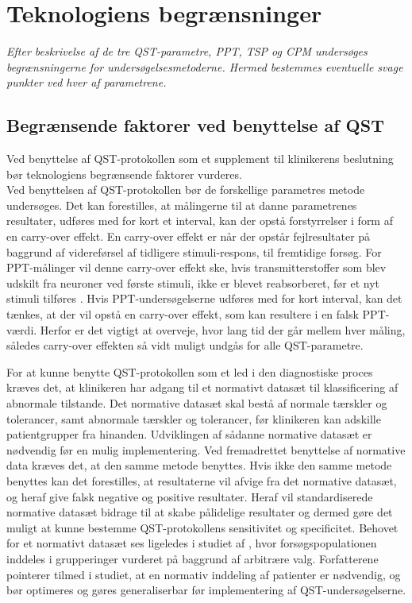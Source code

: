 \section{Teknologiens begrænsninger}
\textit{Efter beskrivelse af de tre QST-parametre, PPT, TSP og CPM undersøges begrænsningerne for undersøgelsesmetoderne. Hermed bestemmes eventuelle svage punkter ved hver af parametrene.}

\subsection{Begrænsende faktorer ved benyttelse af QST}
Ved benyttelse af QST-protokollen som et supplement til klinikerens beslutning bør teknologiens begrænsende faktorer vurderes. \\
Ved benyttelsen af QST-protokollen bør de forskellige parametres metode undersøges. Det kan forestilles, at målingerne til at danne parametrenes resultater, udføres med for kort et interval, kan der opstå forstyrrelser i form af en carry-over effekt. En carry-over effekt er når der opstår fejlresultater på baggrund af videreførsel af tidligere stimuli-respons, til fremtidige forsøg. \citep{Porta2008} For PPT-målinger vil denne carry-over effekt ske, hvis transmitterstoffer som blev udskilt fra neuroner ved første stimuli, ikke er blevet reabsorberet, før et nyt stimuli tilføres \citep{Martini2012}. Hvis PPT-undersøgelserne udføres med for kort interval, kan det tænkes, at der vil opstå en carry-over effekt, som kan resultere i en falsk PPT-værdi. Herfor er det vigtigt at overveje, hvor lang tid der går mellem hver måling, således carry-over effekten så vidt muligt undgås for alle QST-parametre. \citep{Porta2008} 

For at kunne benytte QST-protokollen som et led i den diagnostiske proces kræves det, at klinikeren har adgang til et normativt datasæt til klassificering af abnormale tilstande. Det normative datasæt skal bestå af normale tærskler og tolerancer, samt abnormale tærskler og tolerancer, før klinikeren kan adskille patientgrupper fra hinanden. Udviklingen af sådanne normative datasæt er nødvendig før en mulig implementering. Ved fremadrettet benyttelse af normative data kræves det, at den samme metode benyttes. Hvis ikke den samme metode benyttes kan det forestilles, at resultaterne vil afvige fra det normative datasæt, og heraf give falsk negative og positive resultater. Heraf vil standardiserede normative datasæt bidrage til at skabe pålidelige resultater og dermed gøre det muligt at kunne bestemme QST-protokollens sensitivitet og specificitet. \citep{Yarnitsky1997} Behovet for et normativt datasæt ses ligeledes i studiet af , hvor forsøgspopulationen inddeles i grupperinger vurderet på baggrund af arbitrære valg. Forfatterene pointerer tilmed i studiet, at en normativ inddeling af patienter er nødvendig, og bør optimeres og gøres generaliserbar før implementering af QST-undersøgelserne. \citep{Petersen2016} 

